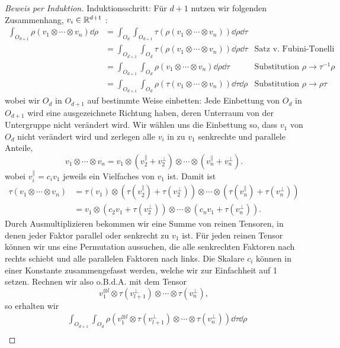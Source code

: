 \begin{proof}[Beweis per Induktion]
\medbreak
Induktionsschritt: Für $d+1$ nutzen wir folgenden Zusammenhang, $ v_i\in\mathbb{R}^{d+1}$ :
\begin{align*}
\int_{O_{d+1}} \rho (v_1\otimes\cdots \otimes v_n) \dd \rho &= \int_{O_{d}} \int_{O_{d+1}} \tau(\rho (v_1\otimes\cdots \otimes v_n)) \dd \rho \dd \tau \\
&= \int_{O_{d+1}} \int_{O_{d}} \tau(\rho (v_1\otimes\cdots \otimes v_n)) \dd \rho \dd \tau &\text{Satz v. Fubini-Tonelli}\\
&= \int_{O_{d+1}} \int_{O_{d}} \rho (v_1\otimes\cdots \otimes v_n) \dd \rho \dd \tau & \text{Substitution }\rho\to\tau^{-1}\rho \\
&= \int_{O_{d+1}} \int_{O_{d}} \rho(\tau (v_1\otimes\cdots \otimes v_n)) \dd \tau \dd \rho & \text{Substitution }\rho\to\rho\tau 
\end{align*}
wobei wir $O_d$ in $O_{d+1}$ auf bestimmte Weise einbetten: Jede Einbettung von $O_d$ in $O_{d+1}$ wird eine ausgezeichnete Richtung haben, deren Unterraum von der Untergruppe nicht verändert wird. Wir wählen uns die Einbettung so, dass $v_1$ von $O_d$ nicht verändert wird und zerlegen alle $v_i$ in zu $v_1$ senkrechte und parallele Anteile,
\[
v_1\otimes\cdots \otimes v_n = v_1 \otimes (v_2^\parallel + v_2^\perp)\otimes \cdots \otimes (v_n^\parallel + v_n^\perp) .
\]
wobei $v_i^\parallel=c_i v_1$ jeweils ein Vielfaches von $v_1$ ist. Damit ist
\begin{align*}
\tau(v_1\otimes\cdots \otimes v_n) &= \tau(v_1) \otimes (\tau(v_2^\parallel) + \tau(v_2^\perp))\otimes \cdots \otimes (\tau(v_n^\parallel) + \tau(v_n^\perp)) \\
&= v_1 \otimes (c_2 v_1 + \tau(v_2^\perp))\otimes \cdots \otimes (c_n v_1 + \tau(v_n^\perp)) .
\end{align*}
Durch Ausmultiplizieren bekommen wir eine Summe von reinen Tensoren, in denen jeder Faktor parallel oder senkrecht zu $v_1$ ist. Für jeden reinen Tensor können wir uns eine Permutation aussuchen, die alle senkrechten Faktoren nach rechts schiebt und alle parallelen Faktoren nach links. Die Skalare $c_i$ können in einer Konstante zusammengefasst werden, welche wir zur Einfachheit auf 1 setzen. Rechnen wir also o.B.d.A. mit dem Tensor
\[
 v_1^{\otimes l} \otimes \tau(v_{l+1}^\perp) \otimes \cdots \otimes \tau(v_n^\perp),
\] 
so erhalten wir
\begin{align*}
	&\int_{O_{d+1}} \int_{O_{d}} \rho\left(v_1^{\otimes l} \otimes \tau(v_{l+1}^\perp) \otimes \cdots \otimes \tau(v_n^\perp)\right) \dd \tau \dd \rho \\

\end{align*}
\end{proof}
